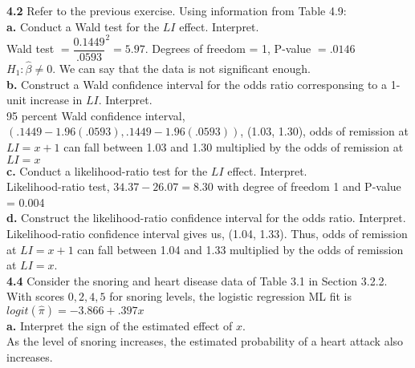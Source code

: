 \documentclass[paper=letter, fontsize=11pt]{scrartcl} %
\begin{document}
\textbf{4.2} Refer to the previous exercise. Using information from Table 4.9: \\

\textbf{a.} Conduct a Wald test for the $LI$ effect. Interpret. \\
Wald test $= \dfrac{0.1449}{.0593}^2 = 5.97$. Degrees of freedom = 1, P-value 
$= .0146$\\
$H_1: \hat{\beta} \not=0.$
We can say that the data is not significant enough.
\\

\textbf{b.} Construct a Wald confidence interval for the odds ratio corresponsing to a 
1-unit increase in $LI$. Interpret. \\
95 percent Wald confidence interval, $(.1449-1.96(.0593), .1449-1.96(.0593))$,
(1.03, 1.30), odds of remission at $LI = x + 1$ can fall between 1.03 and 1.30 
multiplied by the odds of remission at $LI = x$ \\

\textbf{c.} Conduct a likelihood-ratio test for the $LI$ effect. Interpret. \\
Likelihood-ratio test, $34.37 - 26.07 = 8.30$ with degree of freedom 1 and P-value = 0.004 \\

\textbf{d.} Construct the likelihood-ratio confidence interval for the odds ratio. 
Interpret. \\
Likelihood-ratio confidence interval gives us, (1.04, 1.33). Thus, odds of remission 
at $LI = x+1$ can fall between 1.04 and 1.33 multiplied by the odds of remission at 
$LI = x$.
\\

\textbf{4.4} Consider the snoring and heart disease data of Table 3.1 in Section 3.2.2. 
With scores ${0,2,4,5}$ for snoring levels, the logistic regression ML fit is 
$logit(\hat{\pi}) = -3.866 + .397x$ \\

\textbf{a.} Interpret the sign of the estimated effect of $x$. \\
As the level of snoring increases, the estimated probability of a heart attack also
increases.
\\
\end{document}
